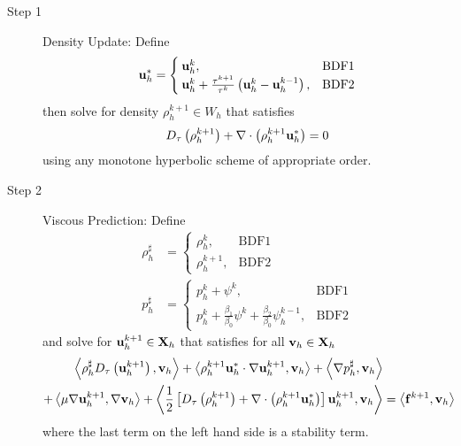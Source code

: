 \documentclass[letterpaper]{erdc}
\begin{document}
\begin{description}
\item[Step 1] Density Update: Define
\begin{equation}
  \textbf{u}_h^{*} = \begin{cases}
                \textbf{u}_h^{k}, & \mbox{BDF1} \\
                \textbf{u}_h^{k} + \frac{\tau^{k+1}}{\tau^k}\left( \textbf{u}_h^{k} - \textbf{u}_h^{k-1}\right), & \mbox{BDF2} 
               \end{cases}
 \end{equation}
then solve for density $\rho_h^{k+1}\in W_h$ that satisfies
\begin{equation}\label{eqn:generaldensity}
D_{\tau}\left(\rho_h^{k+1}\right) + \nabla\cdot\left( \rho_h^{k+1}\textbf{u}_h^{*} \right) = 0
\end{equation}
using any monotone hyperbolic scheme of appropriate order. 

\item[Step 2] Viscous Prediction: Define
\begin{align}
  \rho_h^{\sharp} &= \begin{cases}
                       \rho_h^{k}, & \mbox{BDF1} \\
                       \rho_h^{k+1}, & \mbox{BDF2} 
                      \end{cases}\\
  p_h^{\sharp} &= \begin{cases}
                  p_h^{k} + \psi^{k}, & \mbox{BDF1}\\ 
                  p_h^{k} + \frac{\beta_1}{\beta_0}\psi^{k} + \frac{\beta_2}{\beta_0}\psi_h^{k-1}, & \mbox{BDF2} 
                 \end{cases}
\end{align}
and solve for $\textbf{u}_h^{k+1}\in\textbf{X}_h$ that satisfies for all $\textbf{v}_h\in\textbf{X}_h$
\begin{equation}\label{eqn:generalvelocity}
  \begin{split}
    \left\langle \rho_h^{\sharp}D_{\tau}\left(\textbf{u}_h^{k+1}\right), \textbf{v}_h \right\rangle  + \left\langle \rho_h^{k+1}\textbf{u}_h^{*}\cdot\nabla\textbf{u}_h^{k+1}, \textbf{v}_h \right\rangle +\left\langle \nabla p_h^{\sharp}, \textbf{v}_h \right\rangle &\\
     + \left\langle \mu\nabla\textbf{u}_h^{k+1}, \nabla\textbf{v}_h \right\rangle  + \left\langle \frac{1}{2}\left[ D_{\tau}\left(\rho_h^{k+1}\right) + \nabla\cdot\left( \rho_h^{k+1}\textbf{u}_h^{*} \right)\right] \textbf{u}_h^{k+1}, \textbf{v}_h \right\rangle &= \left\langle \mathbf{f}^{k+1}, \textbf{v}_h \right\rangle
  \end{split}
\end{equation}
where the last term on the left hand side is a stability term.  


\end{description}
\end{document}
